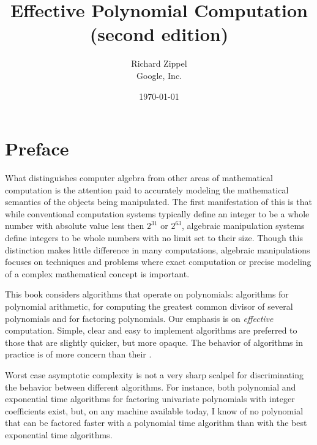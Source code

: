 
\title{Effective Polynomial Computation \\ (second edition)}
\author{Richard Zippel \\ Google, Inc.}

\date{\today}

\maketitle

\setcounter{page}{5}

\cleardoublepage

\tableofcontents

\makeatletter\chapter*{Preface}
\makeatother

What distinguishes computer algebra from other areas of mathematical
computation is the attention paid to accurately modeling the
mathematical semantics of the objects being manipulated.  The first
manifestation of this is that while conventional computation systems
typically define an integer to be a whole number with absolute value
less then $2^{31}$ or $2^{63}$, algebraic manipulation systems define
integers to be whole numbers with no limit set to their size.  Though
this distinction makes little difference in many computations,
algebraic manipulations focuses on techniques and problems where exact
computation or precise modeling of a complex mathematical concept is
important.

This book considers algorithms that operate on polynomials: algorithms
for polynomial arithmetic, for computing the greatest common divisor
of several polynomials and for factoring polynomials.  Our emphasis is
on {\em effective} computation.  Simple, clear and easy to implement
algorithms are preferred to those that are slightly quicker, but more
opaque.  The behavior of algorithms in practice is of more concern
than their .

Worst case asymptotic complexity is not a very sharp scalpel for
discriminating the behavior between different algorithms.  For
instance, both polynomial and exponential time algorithms for
factoring univariate polynomials with integer coefficients exist, but,
on any machine available today, I know of no polynomial that can be
factored faster with a polynomial time algorithm than with the best
exponential time algorithms.

